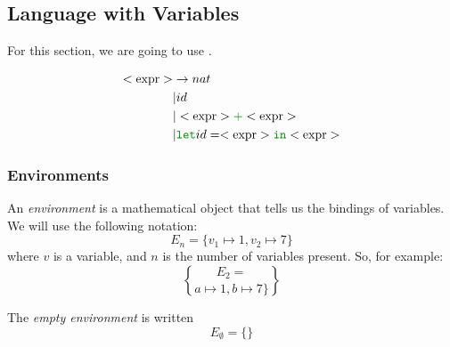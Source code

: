 \subsection{Language with Variables}\label{subsec:Language_with_Variables}
For this section, we are going to use .
\begin{blackbox}
  \begin{equation}\label{eq:LetAdd_Grammar}
    \begin{aligned}
      \Nonterminal{expr} &\rightarrow nat \\
      &\vert id \\
      &\vert \Nonterminal{expr} \textcolor{Green4}{\mathtt{+}} \Nonterminal{expr} \\
      &\vert \textcolor{Green4}{\mathtt{let}} id = \Nonterminal{expr} \textcolor{Green4}{\mathtt{in}} \Nonterminal{expr} \\
    \end{aligned}
  \end{equation}
\end{blackbox}

\subsubsection{Environments}\label{subsubsec:Semantic_Environments}
\begin{definition}[Environment]\label{def:Semantic_Environment}
  An \emph{environment} is a mathematical object that tells us the bindings of variables.
  We will use the following notation:
  \begin{equation}\label{eq:Environment}
    E_{n} = \lbrace v_{1} \mapsto 1, v_{2} \mapsto 7 \rbrace
  \end{equation}
  where $v$ is a variable, and $n$ is the number of variables present.
  So, for example:
  \begin{equation*}
    E_{2} = \brace a \mapsto 1, b \mapsto 7 \rbrace
  \end{equation*}

  \begin{remark}\label{rmk:Empty_Environment}
    The \emph{empty environment} is written
    \begin{equation}\label{eq:Empty_Environment}
      E_{\emptyset} = \lbrace \rbrace
    \end{equation}
  \end{remark}
\end{definition}

